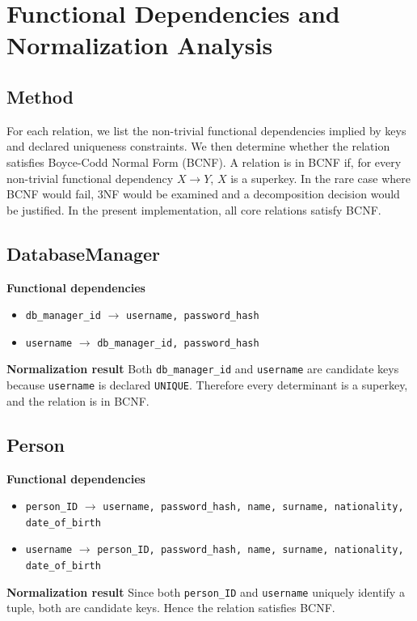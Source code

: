 \documentclass[12pt,a4paper]{article}
\begin{document}
\section{Functional Dependencies and Normalization Analysis}
\subsection{Method}
For each relation, we list the non-trivial functional dependencies implied by keys and declared uniqueness constraints. We then determine whether the relation satisfies Boyce-Codd Normal Form (BCNF). A relation is in BCNF if, for every non-trivial functional dependency $X \rightarrow Y$, $X$ is a superkey. In the rare case where BCNF would fail, 3NF would be examined and a decomposition decision would be justified. In the present implementation, all core relations satisfy BCNF.

\subsection{DatabaseManager}
\textbf{Functional dependencies}
\begin{itemize}
    \item \texttt{db\_manager\_id} $\rightarrow$ \texttt{username, password\_hash}
    \item \texttt{username} $\rightarrow$ \texttt{db\_manager\_id, password\_hash}
\end{itemize}
\textbf{Normalization result} Both \texttt{db\_manager\_id} and \texttt{username} are candidate keys because \texttt{username} is declared \texttt{UNIQUE}. Therefore every determinant is a superkey, and the relation is in BCNF.

\subsection{Person}
\textbf{Functional dependencies}
\begin{itemize}
    \item \texttt{person\_ID} $\rightarrow$ \texttt{username, password\_hash, name, surname, nationality, date\_of\_birth}
    \item \texttt{username} $\rightarrow$ \texttt{person\_ID, password\_hash, name, surname, nationality, date\_of\_birth}
\end{itemize}
\textbf{Normalization result} Since both \texttt{person\_ID} and \texttt{username} uniquely identify a tuple, both are candidate keys. Hence the relation satisfies BCNF.
\end{document}
